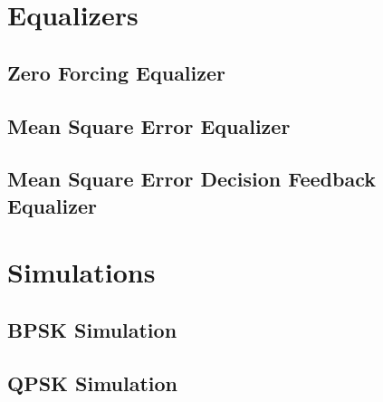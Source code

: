 \documentclass[]{article}
\begin{document}
\section{Equalizers}
\label{app:equal}

\subsection{Zero Forcing Equalizer}
\label{app:zf}


\subsection{Mean Square Error Equalizer}
\label{app:mse}


\subsection{Mean Square Error Decision Feedback Equalizer}
\label{app:dfe}


\section{Simulations}
\subsection{BPSK Simulation}


\subsection{QPSK Simulation}

\end{document}

